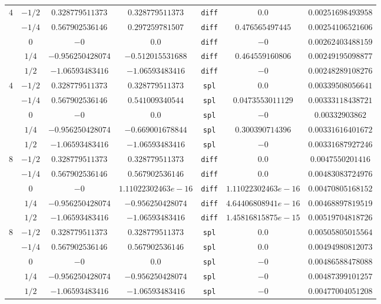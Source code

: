 \documentclass[12pt,letterpaper]{article}
\begin{document}
\begin{table}
\begin{center}
\begin{tabular}{|c|c|c|c|c|c|c|}
		\multirow{5}{*}{$4$}
			& $-1/2$ & $0.328779511373$ & $0.328779511373$ & \verb+diff+ & $0.0$ & $0.00251698493958$ \\
			& $-1/4$ & $0.567902536146$ & $0.297259781507$ & \verb+diff+ & $0.476565497445$ & $0.00254106521606$ \\
			& $0$ & $-0$ & $0.0$ & \verb+diff+ & $-0$ & $0.00262403488159$ \\
			& $1/4$ & $-0.956250428074$ & $-0.512015531688$ & \verb+diff+ & $0.464559160806$ & $0.00249195098877$ \\
			& $1/2$ & $-1.06593483416$ & $-1.06593483416$ & \verb+diff+ & $-0$ & $0.00248289108276$ \\
		\hline
		\multirow{5}{*}{$4$}
			& $-1/2$ & $0.328779511373$ & $0.328779511373$ & \verb+spl+ & $0.0$ & $0.00339508056641$ \\
			& $-1/4$ & $0.567902536146$ & $0.541009340544$ & \verb+spl+ & $0.0473553011129$ & $0.00333118438721$ \\
			& $0$ & $-0$ & $0.0$ & \verb+spl+ & $-0$ & $0.00332903862$ \\
			& $1/4$ & $-0.956250428074$ & $-0.669001678844$ & \verb+spl+ & $0.300390714396$ & $0.00331616401672$ \\
			& $1/2$ & $-1.06593483416$ & $-1.06593483416$ & \verb+spl+ & $-0$ & $0.00331687927246$ \\
		\hline \hline
		
		\multirow{5}{*}{$8$}
			& $-1/2$ & $0.328779511373$ & $0.328779511373$ & \verb+diff+ & $0.0$ & $0.0047550201416$ \\
			& $-1/4$ & $0.567902536146$ & $0.567902536146$ & \verb+diff+ & $0.0$ & $0.00483083724976$ \\
			& $0$ & $-0$ & $1.11022302463e-16$ & \verb+diff+ & $1.11022302463e-16$ & $0.00470805168152$ \\
			& $1/4$ & $-0.956250428074$ & $-0.956250428074$ & \verb+diff+ & $4.64406808941e-16$ & $0.00468897819519$ \\
			& $1/2$ & $-1.06593483416$ & $-1.06593483416$ & \verb+diff+ & $1.45816815875e-15$ & $0.00519704818726$ \\
		\hline
		\multirow{5}{*}{$8$}
			& $-1/2$ & $0.328779511373$ & $0.328779511373$ & \verb+spl+ & $0.0$ & $0.00505805015564$ \\
			& $-1/4$ & $0.567902536146$ & $0.567902536146$ & \verb+spl+ & $0.0$ & $0.00494980812073$ \\
			& $0$ & $-0$ & $0.0$ & \verb+spl+ & $-0$ & $0.00486588478088$ \\
			& $1/4$ & $-0.956250428074$ & $-0.956250428074$ & \verb+spl+ & $-0$ & $0.00487399101257$ \\
			& $1/2$ & $-1.06593483416$ & $-1.06593483416$ & \verb+spl+ & $-0$ & $0.00477004051208$ \\
		\hline
	\end{tabular}
\end{center}
\end{table}
\end{document}
